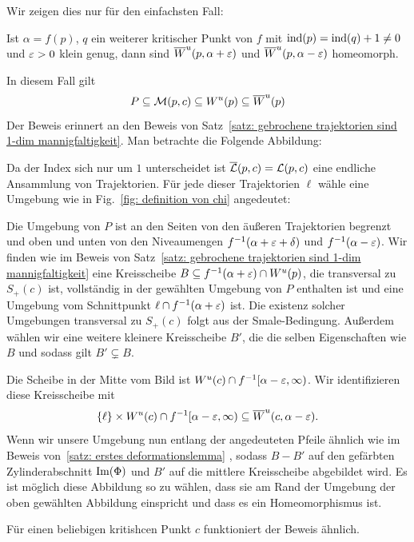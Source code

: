 \begin{bigproof}
   Wir zeigen dies nur für den einfachsten Fall:

    \begin{claim}
        Ist $\alpha = f(p)$, $q$ ein weiterer kritischer Punkt von $f$ mit 
        ${ \operatorname{ind} } (p) = { \operatorname{ind} } (q) + 1 \neq 0$ und $\varepsilon > 0$ klein genug, dann sind 
        ${ \overline{W}^u } (p, \alpha + \varepsilon)$ und ${ \overline{W}^u } (p, \alpha - \varepsilon)$ homeomorph.
    \end{claim}

    \begin{smallproof}
        In diesem Fall gilt 
        \[ P \subseteq \mathcal{M} (p, c) \subseteq { W^u } (p) \subseteq { \overline{W}^u } (p) \]
        Der Beweis erinnert an den Beweis von Satz~\ref{satz: gebrochene trajektorien sind 1-dim mannigfaltigkeit}.
        Man betrachte die Folgende Abbildung:

        Da der Index sich nur um $1$ unterscheidet ist ${\overline{\mathcal{L}} } (p, c) = { \mathcal{L} } (p, c)$ eine endliche Ansammlung 
        von Trajektorien. Für jede dieser Trajektorien $\ell$ wähle eine Umgebung wie in 
        Fig.~\ref{fig: definition von chi} angedeutet:

        Die Umgebung von $P$ ist an den Seiten von den äußeren Trajektorien begrenzt und oben und unten von den
        Niveaumengen $f^{-1}(\alpha + \varepsilon + \delta)$ und $f^{-1}(\alpha - \varepsilon)$. Wir finden wie im Beweis 
        von Satz~\ref{satz: gebrochene trajektorien sind 1-dim mannigfaltigkeit} eine Kreisscheibe 
        $B \subseteq f^{-1}(\alpha + \varepsilon) \cap { W^u } (p)$, die transversal zu $S_+(c)$ ist, vollständig in der 
        gewählten Umgebung von $P$ enthalten ist und eine Umgebung vom Schnittpunkt 
        $\ell \cap f^{-1}(\alpha + \varepsilon)$ ist. Die existenz solcher Umgebungen transversal zu $S_+(c)$ folgt 
        aus der Smale-Bedingung. Außerdem wählen wir eine weitere kleinere Kreisscheibe $B'$, 
        die die selben Eigenschaften wie $B$ und sodass gilt $B' \subsetneq B$. 

        Die Scheibe in der Mitte vom Bild ist ${ W^u } (c) \cap f^{-1} [\alpha - \varepsilon, \infty)$. 
        Wir identifizieren diese Kreisscheibe mit 
        \[ \{ \ell \} \times { W^u } (c) \cap f^{-1} [\alpha - \varepsilon, \infty) \subseteq 
            { \overline{W}^u } (c, \alpha - \varepsilon) . \]
        Wenn wir unsere Umgebung nun entlang der angedeuteten Pfeile ähnlich wie im Beweis 
        von~\ref{satz: erstes deformationslemma} , sodass 
        $B - B'$ auf den gefärbten Zylinderabschnitt ${ \operatorname{Im} } (\Phi)$ und $B'$ auf die mittlere Kreisscheibe 
        abgebildet wird. Es ist möglich diese Abbildung so zu wählen, dass sie am Rand der Umgebung der 
        oben gewählten Abbildung einspricht und dass es ein Homeomorphismus ist.
    \end{smallproof}

    Für einen beliebigen kritishcen Punkt $c$ funktioniert der Beweis ähnlich.
\end{bigproof}

